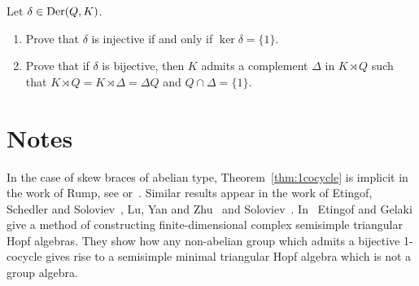 \begin{prob}
	\label{xca:ker1cocycle}
	Let $\delta\in\operatorname{Der}(Q,K)$. 
	\begin{enumerate}
	\item Prove that $\delta$ is injective if and only if 
	$\ker\delta=\{1\}$.
	\item Prove that if $\delta$ is bijective, then  
	$K$ admits a complement 
	$\Delta$ in $K\rtimes Q$ such that $K\rtimes Q=K\rtimes\Delta=\Delta Q$ and 
	$Q\cap\Delta=\{1\}$.
	\end{enumerate}
\end{prob}



\section{Notes}

In the case of skew braces of abelian type, Theorem~\ref{thm:1cocycle} is implicit in the work of Rump, see \cite{MR2278047,MR3291816} or~\cite{MR3177933}. Similar results appear 
in the work of Etingof, Schedler and Soloviev~\cite{MR1722951}, Lu, Yan and Zhu~\cite{MR1769723} 
and Soloviev~\cite{MR1809284}.
In~\cite{MR1653340} Etingof and Gelaki give a method of constructing finite-dimensional complex semisimple triangular Hopf algebras. They show how any non-abelian group which admits a bijective 1-cocycle gives rise to a semisimple minimal triangular Hopf algebra which is not a group algebra.